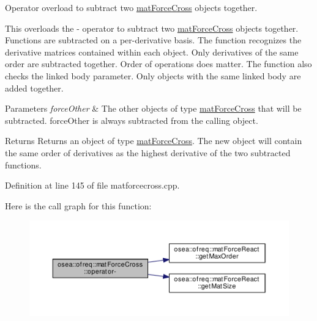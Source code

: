 Operator overload to subtract two \hyperlink{classosea_1_1ofreq_1_1mat_force_cross}{mat\-Force\-Cross} objects together. 

This overloads the -\/ operator to subtract two \hyperlink{classosea_1_1ofreq_1_1mat_force_cross}{mat\-Force\-Cross} objects together. Functions are subtracted on a per-\/derivative basis. The function recognizes the derivative matrices contained within each object. Only derivatives of the same order are subtracted together. Order of operations does matter. The function also checks the linked body parameter. Only objects with the same linked body are added together. 
\begin{DoxyParams}{Parameters}
{\em force\-Other} & The other objects of type \hyperlink{classosea_1_1ofreq_1_1mat_force_cross}{mat\-Force\-Cross} that will be subtracted. force\-Other is always subtracted from the calling object. \\
\hline
\end{DoxyParams}
\begin{DoxyReturn}{Returns}
Returns an object of type \hyperlink{classosea_1_1ofreq_1_1mat_force_cross}{mat\-Force\-Cross}. The new object will contain the same order of derivatives as the highest derivative of the two subtracted functions. 
\end{DoxyReturn}


Definition at line 145 of file matforcecross.\-cpp.



Here is the call graph for this function\-:\nopagebreak
\begin{figure}[H]
\begin{center}
\leavevmode
\includegraphics[width=350pt]{classosea_1_1ofreq_1_1mat_force_cross_af22b49c1536dc753f99b34a3eba1c8e7_cgraph}
\end{center}
\end{figure}


